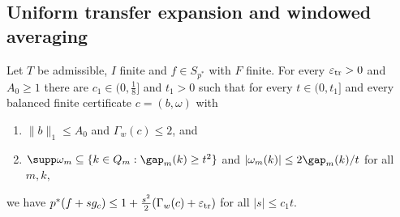 
\subsection{Uniform transfer expansion and windowed averaging}

\begin{lemma}\label{lem:uniformtransfer}
Let $T$ be admissible, $I$ finite and $f\in S_{p^*}$ with $F$ finite.  For
every $\varepsilon_{\rm tr}>0$ and $A_0\ge1$ there are $c_1\in(0,\frac18]$ and
$t_1>0$ such that for every $t\in(0,t_1]$ and every balanced finite
certificate $c=(b,\omega)$ with
\begin{enumerate}
\item[(C-a)] $\|b\|_1\le A_0$ and $\Gamma_w(c)\le2$, and
\item[(C-b)] $\supp\omega_m\subseteq\{k\in Q_m:\gap_m(k)\ge t^2\}$ and
$|\omega_m(k)|\le2\gap_m(k)/t$ for all $m,k$,
\end{enumerate}
we have $p^*(f+sg_c)\le1+\frac{s^2}2(\Gamma_w(c)+\varepsilon_{\rm tr})$ for
all $|s|\le c_1t$.
\end{lemma}

